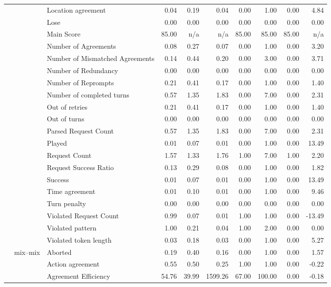 \begin{tabular}{lllrrrrrrr}
 &  & Location agreement & 0.04 & 0.19 & 0.04 & 0.00 & 1.00 & 0.00 & 4.84 \\
 &  & Lose & 0.00 & 0.00 & 0.00 & 0.00 & 0.00 & 0.00 & 0.00 \\
 &  & Main Score & 85.00 & n/a & n/a & 85.00 & 85.00 & 85.00 & n/a \\
 &  & Number of Agreements & 0.08 & 0.27 & 0.07 & 0.00 & 1.00 & 0.00 & 3.20 \\
 &  & Number of Mismatched Agreements & 0.14 & 0.44 & 0.20 & 0.00 & 3.00 & 0.00 & 3.71 \\
 &  & Number of Redundancy & 0.00 & 0.00 & 0.00 & 0.00 & 0.00 & 0.00 & 0.00 \\
 &  & Number of Reprompts & 0.21 & 0.41 & 0.17 & 0.00 & 1.00 & 0.00 & 1.40 \\
 &  & Number of completed turns & 0.57 & 1.35 & 1.83 & 0.00 & 7.00 & 0.00 & 2.31 \\
 &  & Out of retries & 0.21 & 0.41 & 0.17 & 0.00 & 1.00 & 0.00 & 1.40 \\
 &  & Out of turns & 0.00 & 0.00 & 0.00 & 0.00 & 0.00 & 0.00 & 0.00 \\
 &  & Parsed Request Count & 0.57 & 1.35 & 1.83 & 0.00 & 7.00 & 0.00 & 2.31 \\
 &  & Played & 0.01 & 0.07 & 0.01 & 0.00 & 1.00 & 0.00 & 13.49 \\
 &  & Request Count & 1.57 & 1.33 & 1.76 & 1.00 & 7.00 & 1.00 & 2.20 \\
 &  & Request Success Ratio & 0.13 & 0.29 & 0.08 & 0.00 & 1.00 & 0.00 & 1.82 \\
 &  & Success & 0.01 & 0.07 & 0.01 & 0.00 & 1.00 & 0.00 & 13.49 \\
 &  & Time agreement & 0.01 & 0.10 & 0.01 & 0.00 & 1.00 & 0.00 & 9.46 \\
 &  & Turn penalty & 0.00 & 0.00 & 0.00 & 0.00 & 0.00 & 0.00 & 0.00 \\
 &  & Violated Request Count & 0.99 & 0.07 & 0.01 & 1.00 & 1.00 & 0.00 & -13.49 \\
 &  & Violated pattern & 1.00 & 0.21 & 0.04 & 1.00 & 2.00 & 0.00 & 0.00 \\
 &  & Violated token length & 0.03 & 0.18 & 0.03 & 0.00 & 1.00 & 0.00 & 5.27 \\
\cline{2-10}
 & \multirow[t]{27}{*}{mix--mix} & Aborted & 0.19 & 0.40 & 0.16 & 0.00 & 1.00 & 0.00 & 1.57 \\
 &  & Action agreement & 0.55 & 0.50 & 0.25 & 1.00 & 1.00 & 0.00 & -0.22 \\
 &  & Agreement Efficiency & 54.76 & 39.99 & 1599.26 & 67.00 & 100.00 & 0.00 & -0.18 \\

\end{tabular}
